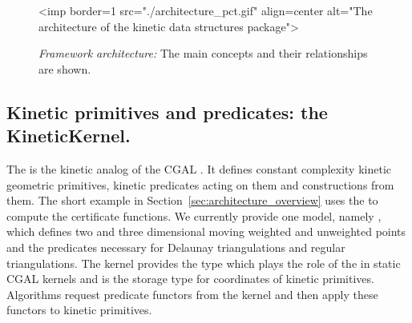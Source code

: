 \begin{figure}[htb]
\begin{ccHtmlOnly}
<imp border=1 src="./architecture_pct.gif" align=center alt="The architecture of the kinetic data structures package">
\end{ccHtmlOnly}
\caption{ \label{fig:architecture} 
{\em Framework architecture:} The main concepts and their relationships are shown. }
\end{figure}



\subsection{Kinetic primitives and predicates: the KineticKernel.}
\label{sec:kinetic_kernel}

The  is the kinetic analog of the CGAL
. It defines constant complexity kinetic geometric
primitives, kinetic predicates acting on them and constructions from
them. The short example in Section~\ref{sec:architecture_overview}
uses the  to compute the 
certificate functions. We currently provide one model, namely
, which
defines two and three dimensional moving weighted and unweighted
points and the predicates necessary for Delaunay triangulations and
regular triangulations. The kernel provides the type 
which plays the role of the  in static
CGAL kernels and is the storage type for coordinates of kinetic
primitives. Algorithms request predicate functors from the kernel and
then apply these functors to kinetic primitives.

